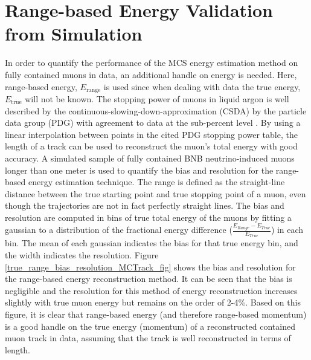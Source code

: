 \documentclass[a4paper,11pt]{article}
\begin{document}
\section{Range-based Energy Validation from Simulation}\label{Range_Energy_Validation_section}
In order to quantify the performance of the MCS energy estimation method on fully contained muons in data, an additional handle on energy is needed. Here, range-based energy, $E_{\text{range}}$ is used since when dealing with data the true energy, $E_{\text{true}}$ will not be known. The stopping power of muons in liquid argon is well described by the continuous-slowing-down-approximation (CSDA) by the particle data group (PDG) with agreement to data at the sub-percent level \cite{MIPenergysource} \cite{PDG_spline_table} \cite{NISTdata}. By using a linear interpolation between points in the cited PDG stopping power table, the length of a track can be used to reconstruct the muon's total energy with good accuracy. A simulated sample of fully contained BNB neutrino-induced muons longer than one meter is used to quantify the bias and resolution for the range-based energy estimation technique. The range is defined as the straight-line distance between the true starting point and true stopping point of a muon, even though the trajectories are not in fact perfectly straight lines. The bias and resolution are computed in bins of true total energy of the muons by fitting a gaussian to a distribution of the fractional energy difference ($\frac{E_{Range}-E_{True}}{E_{True}}$) in each bin. The mean of each gaussian indicates the bias for that true energy bin, and the width indicates the resolution. Figure \ref{true_range_bias_resolution_MCTrack_fig} shows the bias and resolution for the range-based energy reconstruction method. It can be seen that the bias is negligible and the resolution for this method of energy reconstruction increases slightly with true muon energy but remains on the order of 2-4\%. Based on this figure, it is clear that range-based energy (and therefore range-based momentum) is a good handle on the true energy (momentum) of a reconstructed contained muon track in data, assuming that the track is well reconstructed in terms of length.
\end{document}
